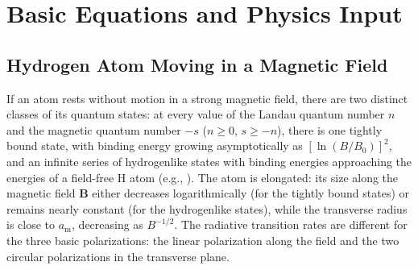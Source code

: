 \documentclass{emulateapj}
\newcommand{\am}{a_\mathrm{m}}
\begin{document}
      \section{Basic Equations and Physics Input}
\label{sect-input}
%
       \subsection{Hydrogen Atom Moving in a Magnetic Field}
\label{sect-H-atom}
%
If an atom rests without motion in a strong magnetic field,
there are two distinct classes of
its quantum states: at every value of the Landau quantum number $n$
and the magnetic quantum number $-s$ ($n\geq 0$, $s\geq -n$), 
there is one tightly bound
state, with
binding energy growing asymptotically as $[\ln (B/B_0)]^2$, 
and an infinite
series of hydrogenlike states 
with binding energies approaching
the energies of a field-free H atom (e.g.,
\citealp{CanutoVentura}). The atom is elongated:
its size along the magnetic field
$\bm{B}$ either decreases logarithmically (for 
the tightly bound states)
or remains nearly constant (for the hydrogenlike states), 
while the transverse radius is close to $\am$, decreasing as $B^{-1/2}$.
The radiative transition rates 
are different for the three basic polarizations:
the linear polarization along the field and the two circular
polarizations in the transverse plane. 
\end{document}
